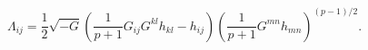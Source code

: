 \begin{equation}
{\Lambda}_{ij}=\frac {1}{2}\sqrt{-G}\left(\frac{1}{p+1}G_{ij}G^{kl}h_{kl}
-h_{ij}\right)\left(\frac{1}{p+1}G^{mn}h_{mn}\right)^{(p-1)/2}.
\end{equation}

